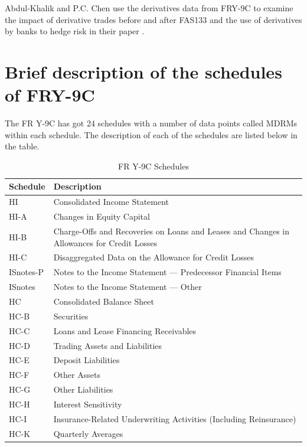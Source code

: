 \documentclass[conference]{IEEEtran}
\begin{document}
Abdul-Khalik and P.C. Chen use the derivatives data from FRY-9C to examine the impact of derivative trades before and after FAS133 and the use of derivatives by banks to hedge risk in their paper . \cite{der9C}


\section{Brief description of the schedules of FRY-9C}
    The FR Y-9C has got 24 schedules with a number of data points called MDRMs within each schedule. The description of each of the schedules are listed below in the table.
    \begin{table}[htbp]
    	\centering
    	\caption{FR Y-9C Schedules\cite{Fed9C}}
    	\begin{tabular}{|p{1.5cm}|p{6cm}|}
    		\hline
    		\textbf{Schedule} & \textbf{Description} \\
    		\hline
    		HI & Consolidated Income Statement \\
    		\hline
    		HI-A & Changes in Equity Capital \\
    		\hline
    		HI-B & Charge-Offs and Recoveries on Loans and Leases and Changes in Allowances for Credit Losses \\
    		\hline
    		HI-C & Disaggregated Data on the Allowance for Credit Losses \\
    		\hline
    		ISnotes-P & Notes to the Income Statement — Predecessor Financial Items \\
    		\hline
    		ISnotes & Notes to the Income Statement — Other \\
    		\hline
    		HC & Consolidated Balance Sheet \\
    		\hline
    		HC-B & Securities \\
    		\hline
    		HC-C & Loans and Lease Financing Receivables \\
    		\hline
    		HC-D & Trading Assets and Liabilities \\
    		\hline
    		HC-E & Deposit Liabilities \\
    		\hline
    		HC-F & Other Assets \\
    		\hline
    		HC-G & Other Liabilities \\
    		\hline
    		HC-H & Interest Sensitivity \\
    		\hline
    		HC-I & Insurance-Related Underwriting Activities (Including Reinsurance) \\
    		\hline
    		HC-K & Quarterly Averages \\

\end{tabular}
\end{table}
\end{document}
